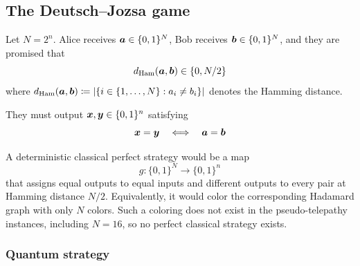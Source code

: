 \subsection{The Deutsch--Jozsa game}\label{sec:deutsch-jozsa-game}

Let
\(
N=2^n
\).
Alice receives \({\boldsymbol{a}}\in\{0,1\}^N\), Bob receives \({\boldsymbol{b}}\in\{0,1\}^N\), and they are promised that
\[
d_{\text{Ham}}({\boldsymbol{a}},{\boldsymbol{b}})
\in
\{0, N/2\}
\]
where $d_{\text{Ham}}({\boldsymbol{a}},{\boldsymbol{b}})
\coloneq
\left|\{i \in \{1, \ldots, N\}: a_i \neq b_i\}\right|
$ denotes the Hamming distance.

They must output \({\boldsymbol{x}},{\boldsymbol{y}}\in\{0,1\}^n\) satisfying
\[
{\boldsymbol{x}}={\boldsymbol{y}}
\quad\Longleftrightarrow\quad
{\boldsymbol{a}}={\boldsymbol{b}}
\]

A deterministic classical perfect strategy would be a map
\[
g:\{0,1\}^N\to\{0,1\}^n
\]
that assigns equal outputs to equal inputs and different outputs to every pair at Hamming distance \(N/2\).
Equivalently, it would color the corresponding Hadamard graph with only \(N\) colors.
Such a coloring does not exist in the pseudo-telepathy instances, including \(N=16\), so no perfect classical strategy exists.

\subsubsection*{Quantum strategy}

